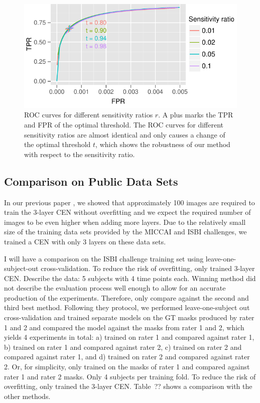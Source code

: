 \begin{figure}
\centering
\includegraphics[width=\columnwidth]{figures/roc}
\caption{ROC curves for different sensitivity ratios $r$. A plus marks the TPR
and FPR of the optimal threshold. The ROC curves for different sensitivity
ratios are almost identical and only causes a change of the optimal threshold
$t$, which shows the robustness of our method with respect to the sensitivity
ratio.}
\end{figure}

\subsection{Comparison on Public Data Sets}

In our previous paper \cite{brosch2015}, we showed that approximately 100 images
are required to train the 3-layer CEN without overfitting and we expect the
required number of images to be even higher when adding more layers. Due to the
relatively small size of the training data sets provided by the MICCAI and ISBI
challenges, we trained a CEN with only 3 layers on these data sets.

I will have a comparison on the ISBI challenge training set using
leave-one-subject-out cross-validation. To reduce the risk of overfitting, only
trained 3-layer CEN. Describe the data: 5 subjects with 4 time points each.
Winning method did not describe the evaluation process well enough to allow for
an accurate production of the experiments. Therefore, only compare against the
second and third best method. Following they protocol, we performed
leave-one-subject out cross-validation and trained separate models on the GT
masks produced by rater 1 and 2 and compared the model against the masks from
rater 1 and 2, which yields 4 experiments in total: a) trained on rater 1 and
compared against rater 1, b) trained on rater 1 and compared against rater 2, c)
trained on rater 2 and compared against rater 1, and d) trained on rater 2 and
compared against rater 2. Or, for simplicity, only trained on the masks of rater
1 and compared against rater 1 and rater 2 masks. Only 4 subjects per training
fold. To reduce the risk of overfitting, only trained the 3-layer CEN. Table~??
shows a comparison with the other methods.

